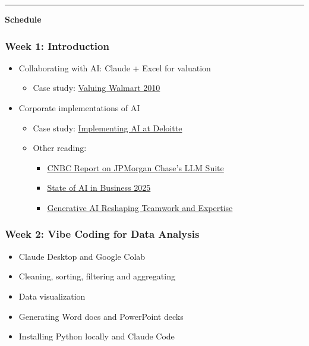 \documentclass[11pt]{article}
\begin{document}
\vspace{1cm}
\hrule
\vspace{0.5cm}

\begin{center}
\textbf{\Large  Schedule}
\end{center}

\subsubsection*{Week 1: Introduction}
\begin{itemize}\setlength{\itemsep}{0pt}
\item Collaborating with AI: Claude + Excel for valuation
\begin{itemize}
\item Case study: \href{https://hbsp.harvard.edu/product/W11058-PDF-ENG}{Valuing Walmart 2010}
\end{itemize}
\item Corporate implementations of AI
\begin{itemize}

\item Case study: \href{https://hbsp.harvard.edu/product/HEC382-PDF-ENG}{Implementing AI at Deloitte}
\item Other reading:
\begin{itemize} 
    \item \href{https://www.cnbc.com/2025/09/30/jpmorgan-chase-fully-ai-connected-megabank.html}{CNBC Report on JPMorgan Chase's LLM Suite}
\item \href{https://mlq.ai/media/quarterly_decks/v0.1_State_of_AI_in_Business_2025_Report.pdf}{State of AI in Business 2025}
\item
\href{https://papers.ssrn.com/sol3/papers.cfm?abstract_id=5188231}{Generative AI Reshaping Teamwork and Expertise}
\end{itemize}
\end{itemize}
\end{itemize}

\subsubsection*{Week 2: Vibe Coding for Data Analysis}
\begin{itemize}\setlength{\itemsep}{0pt}
\item Claude Desktop and Google Colab
\item Cleaning, sorting, filtering and aggregating
\item Data visualization
\item Generating Word docs and PowerPoint decks 
\item Installing Python locally and Claude Code
\end{itemize}
\end{document}
